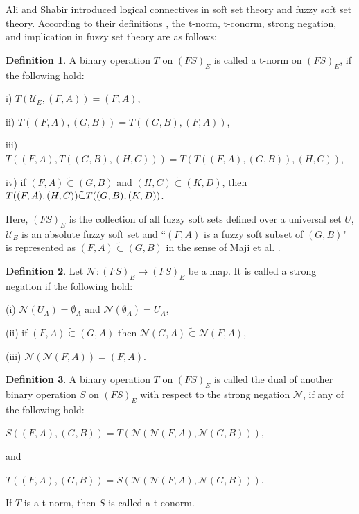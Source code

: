 \documentclass{article}
\theoremstyle{definition}
\newtheorem{definition}{Definition}[section]
\begin{document}
Ali and Shabir \cite{6} introduced logical connectives in soft set theory and fuzzy soft set theory. According to their definitions \cite{6}, the t-norm, t-conorm, strong negation, and implication in fuzzy set theory are as follows:\\

\begin{definition}\cite{6}
    A binary operation $T$ on $(FS)_E$ is called a t-norm on $(FS)_E$, if the following  hold:\vspace{1.5mm}
    
    i) $T(\mathcal{U}_E, (F, A))= (F, A)$,

    ii) $T((F, A), (G, B))=T((G, B), (F, A))$,

    iii) $T((F, A), T((G, B), (H, C))) = T(T((F, A), (G, B)), (H, C))$,

    iv) if $(F, A)\tilde{\subset} (G, B)$ and  $(H, C)\tilde{\subset} (K, D)$, then $T((F, A), (H, C)) \tilde{\subset} T((G, B), (K,\\ D))$.\\
    
    
    \vspace{1.5mm}

Here, $(FS)_E$ is the collection of all fuzzy soft sets defined over a universal set $U$, $\mathcal{U}_E$ is an absolute fuzzy soft set  and  ``$(F, A)$ is a fuzzy soft subset of $(G, B)$"  is represented as $(F, A)\tilde{\subset} (G, B)$ in the sense of  Maji et al. \cite{7}.\vspace{1.5mm}
\end{definition}

\begin{definition}\cite{6}
    Let $\mathcal{N}:(FS)_E \to (FS)_E$ be a map. It is called a strong negation if the following hold:

    (i) $\mathcal{N}(U_A)={\emptyset}_A$ and $\mathcal{N}({\emptyset}_A)=U_A$,

    (ii) if $(F, A) \tilde{\subset} (G, A)$ then $\mathcal{N}(G, A)\tilde{\subset} \mathcal{N}(F, A)$,

    (iii) $\mathcal{N}(\mathcal{N}(F, A))=(F, A)$.
\end{definition}


\begin{definition}\cite{6}
    A binary operation $T$ on $(FS)_E$ is called the dual of another binary operation $S$ on $(FS)_E$ with respect to the strong negation $\mathcal{N}$, if any of the following hold:\\
   \begin{center}
       $S((F, A), (G, B))=T(\mathcal{N}(\mathcal{N}(F, A), \mathcal{N}(G, B)))$,
   \end{center} 
    
    and\\

    
    \begin{center}
         $T((F, A), (G, B))=S(\mathcal{N}(\mathcal{N}(F, A), \mathcal{N}(G, B)))$.\\
    \end{center}
   
    If $T$ is a t-norm, then $S$ is called a t-conorm.
\end{definition}
\end{document}
